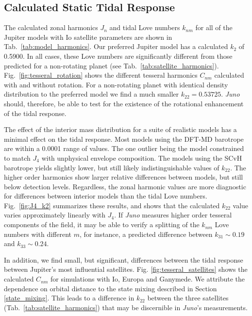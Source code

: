 \subsection{Calculated Static Tidal Response}

The calculated zonal harmonics $J_n$ and tidal Love numbers $k_{nm}$ for all of the
Jupiter models with Io satellite parameters are shown in
Tab.~\ref{tab:model_harmonics}. Our preferred Jupiter model has a calculated $k_{2}$
of 0.5900. In all cases, these Love numbers are significantly different from those
predicted for a non-rotating planet (see Tab.~\ref{tab:satellite_harmonics}).
Fig.~\ref{fig:tesseral_rotation} shows the different tesseral harmonics $C_{nm}$
calculated with and without rotation. For a non-rotating planet with identical
density distribution to the preferred model we find a much smaller $k_{22}=0.53725$.
\textit{Juno} should, therefore, be able to test for the existence of the rotational
enhancement of the tidal response.

The effect of the interior mass distribution for a suite of realistic models has a
minimal effect on the tidal response. Most models using the DFT-MD barotrope are
within a 0.0001 range of values. The one outlier being the model constrained to match
$J_4$ with unphysical envelope composition. The models using the SCvH barotrope
yields slightly lower, but still likely indistinguishable values of $k_{22}$. The
higher order harmonics show larger relative differences between models, but still
below detection levels. Regardless, the zonal harmonic values are more diagnostic for
differences between interior models than the tidal Love numbers. Fig.~\ref{fig:J4_k2}
summarizes these results, and shows that the calculated $k_{22}$ value varies
approximately linearly with $J_4$.  If \textit{Juno} measures higher order tesseral
components of the field, it may be able to verify a splitting of the $k_{nm}$ Love
numbers with different $m$, for instance, a predicted difference between
$k_{31}\sim0.19$ and $k_{33}\sim0.24$.

In addition, we find small, but significant, differences between the tidal response
between Jupiter's most influential satellites. Fig. \ref{fig:tesseral_satellites}
shows the calculated $C_{nm}$ for simulations with Io, Europa and Ganymede. We
attribute the dependence on orbital distance to the state mixing described in Section
\ref{state_mixing}. This leads to a difference in $k_{22}$ between the three
satellites (Tab.~\ref{tab:satellite_harmonics}) that may be discernible in
\textit{Juno}'s measurements.



